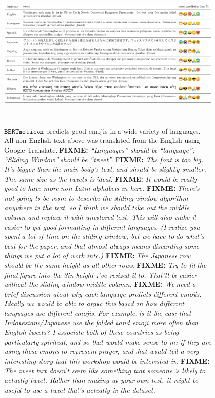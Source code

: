 \documentclass[11pt]{article}
\newcommand{\fixme}[1]{{\color{red} \textbf{FIXME:} {\textit {#1}}}}
\newcommand{\bertmoji}{\texttt{BERTmoticon}}
\begin{document}
\begin{figure}
    \centering
    \includegraphics[height=3in]{images/table_fixed.pdf}
    \caption{
        $\bertmoji$ predicts good emojis in a wide variety of languages.
        All non-English text above was translated from the English using Google Translate.
        \fixme{
            ``Languages'' should be ``language''; ``Sliding Window'' should be ``tweet''.
        }
        \fixme{
            The font is too big.  It's bigger than the main body's text, and should be slightly smaller.  The same size as the tweets is ideal.
        }
        \fixme{
            It would be really good to have more non-Latin alphabets in here.
        }
        \fixme{
            There's not going to be room to describe the sliding window algorithm anywhere in the text,
            so I think we should take out the middle column and replace it with uncolored text.
            This will also make it easier to get good formatting in different languages.
            (I realize you spent a lot of time on the sliding window,
            but we have to do what's best for the paper,
            and that almost always means discarding some things we put a lot of work into.)
        }
        \fixme{
            The Japanese row should be the same height as all other rows.
        }
        \fixme{
            Try to fit the final figure into the 3in height I've resized it to.
            That'll be easier without the sliding window middle column.
        }
        \fixme{
            We need a brief discussion about why each language predicts different emojis.
            Ideally we would be able to argue this based on how different languages use different emojis.
            For example, is it the case that Indonesians/Japanese use the folded hand emoji more often than English tweets?
            I associate both of these countries as being particularly spiritual, and so that would make sense to me if they are using these emojis to represent prayer,
            and that would tell a very interesting story that this workshop would be interested in.
        }
        \fixme{
            The tweet text doesn't seem like something that someone is likely to actually tweet.  Rather than making up your own text, it might be useful to use a tweet that's actually in the dataset.
        }
     }
    \label{fig:prediction_top10_langs}
\end{figure}
\end{document}
